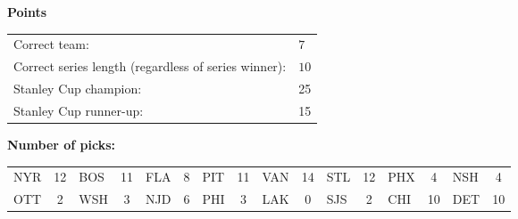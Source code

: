 \documentclass[10pt]{article}
\begin{document}
{\bf Points}\\
\begin{minipage}{12cm}
    \begin{tabular}{l l}
        Correct team:	& $7$\\
        Correct series length (regardless of series winner):	& $10$\\
        Stanley Cup champion:	& 25\\
        Stanley Cup runner-up:	& 15\\
    \end{tabular}

    \vspace{1cm}
    {\bf Number of picks:}\\
    \begin{tabular}{lc | lc | lc | lc | lc | lc | lc | lc }
        NYR & 12 & BOS & 11 & FLA & 8 & PIT & 11 & VAN & 14 & STL & 12 & PHX & 4 & NSH & 4 \\
        OTT & 2 & WSH & 3 & NJD & 6 & PHI & 3 & LAK & 0 & SJS & 2 & CHI & 10 & DET & 10 \\
    \end{tabular}
\end{minipage}
\end{document}
